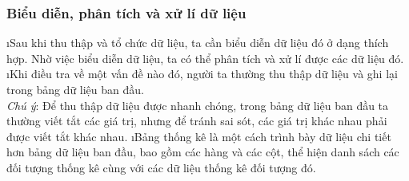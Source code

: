 \subsubsection{Biểu diễn, phân tích và xử lí dữ liệu}
\begin{enumerate}[--,leftmargin=*]
	\i Sau khi thu thập và tổ chức dữ liệu, ta cần biểu diễn dữ liệu đó ở dạng thích hợp. Nhờ việc biểu diễn dữ liệu, ta có thể phân tích và xử lí được các dữ liệu đó.
	\i Khi điều tra về một vấn đề nào đó, người ta thường thu thập dữ liệu và ghi lại trong bảng dữ liệu ban đầu.\\
	\textit{Chú ý}: Để thu thập dữ liệu được nhanh chóng, trong bảng dữ liệu ban đầu ta thường viết tắt các giá trị, nhưng để tránh sai sót, các giá trị khác nhau phải được viết tắt khác nhau.
	\i Bảng thống kê là một cách trình bày dữ liệu chi tiết hơn bảng dữ liệu ban đầu, bao gồm các hàng và các cột, thể hiện danh sách các đối tượng thống kê cùng với các dữ liệu thống kê đối tượng đó.
\end{enumerate}
